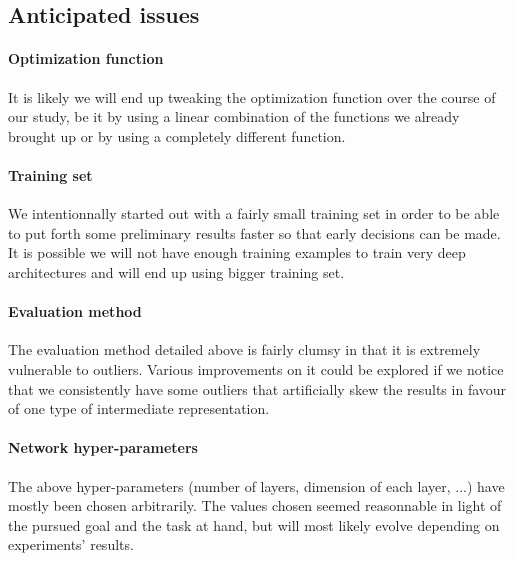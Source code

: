 \documentclass[conference]{IEEEtran}
\begin{document}
\subsection{Anticipated issues}

\paragraph{Optimization function}

It is likely we will end up tweaking the optimization function over the course
of our study, be it by using a linear combination of the functions we already
brought up or by using a completely different function.

\paragraph{Training set}

We intentionnally started out with a fairly small training set in order to be
able to put forth some preliminary results faster so that early decisions can be
made. It is possible we will not have enough training examples to train very
deep architectures and will end up using bigger training set.

\paragraph{Evaluation method}

The evaluation method detailed above is fairly clumsy in that it is extremely
vulnerable to outliers. Various improvements on it could be explored if we
notice that we consistently have some outliers that artificially skew the
results in favour of one type of intermediate representation.

\paragraph{Network hyper-parameters}

The above hyper-parameters (number of layers, dimension of each layer, ...) have
mostly been chosen arbitrarily. The values chosen seemed reasonnable in light of
the pursued goal and the task at hand, but will most likely evolve depending on
experiments' results.

\appendix

\printbibliography
\end{document}
